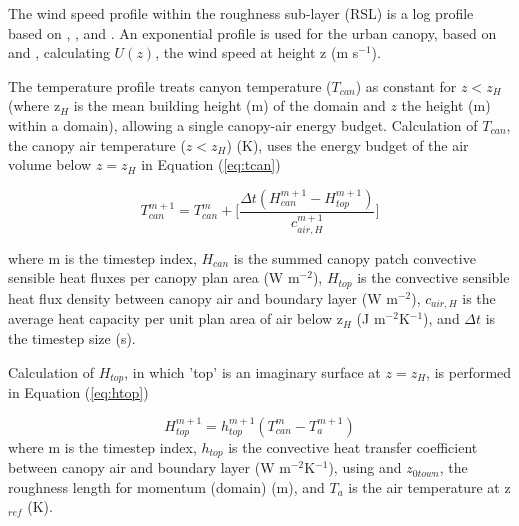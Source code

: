 \documentclass[final,3p,times,authoryear]{elsarticle}
\begin{document}

The wind speed profile within the roughness sub-layer (RSL) is a log profile based on \cite{Masson2000}, \cite{Kusaka2001}, and \cite{Harman2004}. An exponential profile is used for the urban canopy, based on \cite{Masson2000} and \cite{Rotach1995}, calculating $U(z)$, the wind speed at height z (m s$^{-1}$).

\label{sec:tempprof}

The temperature profile treats canyon temperature ($T_{can}$) as constant for $z < z_{H}$ (where z$_{H}$ is the mean building height (m) of the domain and $z$ the height (m) within a domain), allowing a single canopy-air energy budget. Calculation of $T_{can}$, the canopy air temperature ($z < z_{H}$) (K), uses the energy budget of the air volume below $z = z_{H}$ in Equation (\ref{eq:tcan})

\begin{equation} 
T_{can}^{m+1} = T_{can}^{m} + \Bigg[ \frac{\Delta t(H_{can}^{m+1}-H_{top}^{m+1} )}{c_{air,H}^{m+1}}   \Bigg]
\label{eq:tcan} \end{equation} 

where m is the timestep index,
$H_{can}$ is the summed canopy patch convective sensible heat fluxes per canopy plan area (W m$^{-2}$),
$H_{top}$ is the convective sensible heat flux density between canopy air and boundary layer (W m$^{-2}$),
$c_{air,H}$ is the average heat capacity per unit plan area of air below z$_{H}$ (J m$^{-2}$K$^{-1}$), and
$\Delta t$ is the timestep size (s).

Calculation of $H_{top}$, in which 'top' is an imaginary surface at $z = z_{H}$, is performed in Equation (\ref{eq:htop})

\begin{equation} 
H_{top}^{m+1} = h_{top}^{m+1} (T_{can}^{m} - T_{a}^{m+1})
\label{eq:htop} \end{equation} 
where m is the timestep index,
$h_{top}$ is the convective heat transfer coefficient between canopy air and boundary layer (W m$^{-2}$K$^{-1}$), using \cite{Mascart1995} and $z_{0town}$, the roughness length for momentum (domain) (m), and
$T_{a}$ is the air temperature at z$_{ref}$ (K).
\end{document}
